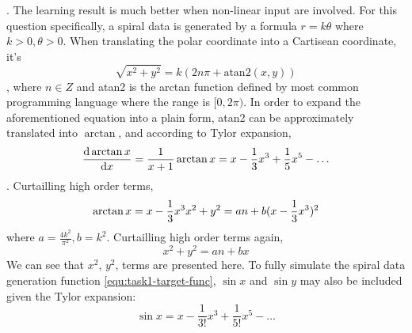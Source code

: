 \documentclass[12pt]{article}
\begin{document}
.
The learning result is much better when non-linear input are involved. For this question specifically, a spiral data is generated by a formula $r=k\theta$ where $k>0, \theta>0$. When translating the polar coordinate into a Cartisean coordinate, it's 
\begin{equation}
\label{equ:task1-target-func}
\sqrt{x^2+y^2}=k(2n\pi+\textrm{atan2}(x,y))
\end{equation}
, where $n\in Z$ and atan2 is the arctan function defined by most common programming language where the range is $[0,2\pi)$. In order to expand the aforementioned equation into a plain form, atan2 can be approximately translated into $\arctan$, and according to Tylor expansion, 
\begin{equation}
    \frac{\textrm{d}\arctan x}{\textrm{d}x}=\frac{1}{x+1}\\
\arctan x=x-\frac{1}{3}x^3+\frac{1}{5}x^5-\ldots
\end{equation}
. Curtailling high order terms, 
$$
\arctan x=x-\frac{1}{3}x^3\\
x^2+y^2=an+b(x-\frac{1}{3}x^3)^2
$$
where $a=\frac{4k^2}{\pi^2},b=k^2$. Curtailling high order terms again, 
$$
x^2+y^2=an+bx
$$
We can see that $x^2$, $y^2$, terms are presented here. To fully simulate the spiral data generation function \ref{equ:task1-target-func}, $\sin x$ and $\sin y$ may also be included given the Tylor expansion:
$$
\sin x=x-\frac{1}{3!}x^3+\frac{1}{5!}x^5-\ldots
$$
\end{document}
